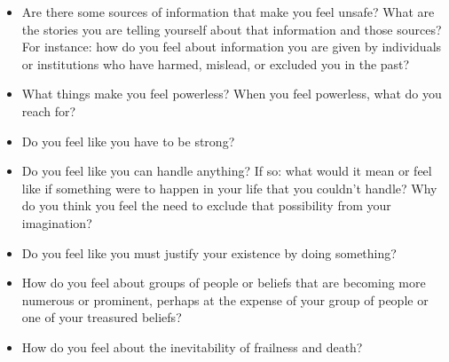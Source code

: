 \documentclass[12pt,letterpaper]{book}
\begin{document}
\begin{itemize}
    \item Are there some sources of information that make you feel unsafe? What are the stories you are telling yourself about that information and those sources? For instance: how do you feel about information you are given by individuals or institutions who have harmed, mislead, or excluded you in the past?
    \item What things make you feel powerless? When you feel powerless, what do you reach for?
    \item Do you feel like you have to be strong?
    \item Do you feel like you can handle anything? If so: what would it mean or feel like if something were to happen in your life that you couldn't handle? Why do you think you feel the need to exclude that possibility from your imagination?
    \item Do you feel like you must justify your existence by doing something?
    \item How do you feel about groups of people or beliefs that are becoming more numerous or prominent, perhaps at the expense of your group of people or one of your treasured beliefs?
    \item How do you feel about the inevitability of frailness and death?
\end{itemize}
\end{document}

